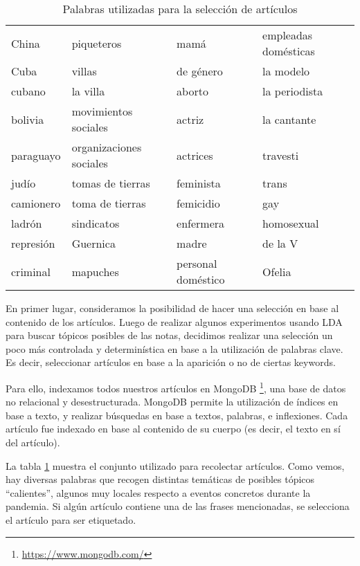 \begin{table}[t]
    \centering
    \begin{tabular}{l | l | l | l}
    China        &  piqueteros              &  mamá                & empleadas domésticas  \\
    Cuba         &  villas                  &  de género           & la modelo             \\
    cubano       &  la villa                &  aborto              & la periodista         \\
    bolivia      &  movimientos sociales    &  actriz              & la cantante           \\
    paraguayo    &  organizaciones sociales &  actrices            & travesti              \\
    judío        &  tomas de tierras        &  feminista           & trans                 \\
    camionero    &  toma de tierras         &  femicidio           & gay                   \\
    ladrón       &  sindicatos              &  enfermera           & homosexual            \\
    represión    &  Guernica                &  madre               & de la V               \\
    criminal     &  mapuches                &  personal doméstico  & Ofelia                \\
    \end{tabular}
    \caption{Palabras utilizadas para la selección de artículos}
    \label{tab:palabras_articulos}
\end{table}
En primer lugar, consideramos la posibilidad de hacer una selección en base al contenido de los artículos. Luego de realizar algunos experimentos usando LDA \cite{blei2003latent} para buscar tópicos posibles de las notas, decidimos realizar una selección un poco más controlada y determinística en base a la utilización de palabras clave. Es decir, seleccionar artículos en base a la aparición o no de ciertas keywords.

Para ello, indexamos todos nuestros artículos en MongoDB \footnote{\url{https://www.mongodb.com/}}, una base de datos no relacional y desestructurada. MongoDB permite la utilización de índices en base a texto, y realizar búsquedas en base a textos, palabras, e inflexiones. Cada artículo fue indexado en base al contenido de su cuerpo (es decir, el texto en sí del artículo).

La tabla \ref{tab:palabras_articulos} muestra el conjunto utilizado para recolectar artículos. Como vemos, hay diversas palabras que recogen distintas temáticas de posibles tópicos ``calientes'', algunos muy locales respecto a eventos concretos durante la pandemia. Si algún artículo contiene una de las frases mencionadas, se selecciona el artículo para ser etiquetado.


